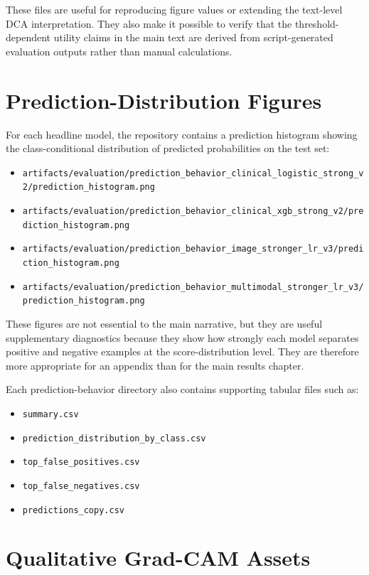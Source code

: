 These files are useful for reproducing figure values or extending the text-level DCA interpretation. They also make it possible to verify that the threshold-dependent utility claims in the main text are derived from script-generated evaluation outputs rather than manual calculations.

\section{Prediction-Distribution Figures}

For each headline model, the repository contains a prediction histogram showing the class-conditional distribution of predicted probabilities on the test set:

\begin{itemize}
    \item \texttt{artifacts/evaluation/prediction\_behavior\_clinical\_logistic\_strong\_v2/prediction\_histogram.png}
    \item \texttt{artifacts/evaluation/prediction\_behavior\_clinical\_xgb\_strong\_v2/prediction\_histogram.png}
    \item \texttt{artifacts/evaluation/prediction\_behavior\_image\_stronger\_lr\_v3/prediction\_histogram.png}
    \item \texttt{artifacts/evaluation/prediction\_behavior\_multimodal\_stronger\_lr\_v3/prediction\_histogram.png}
\end{itemize}

These figures are not essential to the main narrative, but they are useful supplementary diagnostics because they show how strongly each model separates positive and negative examples at the score-distribution level. They are therefore more appropriate for an appendix than for the main results chapter.

Each prediction-behavior directory also contains supporting tabular files such as:
\begin{itemize}
    \item \texttt{summary.csv}
    \item \texttt{prediction\_distribution\_by\_class.csv}
    \item \texttt{top\_false\_positives.csv}
    \item \texttt{top\_false\_negatives.csv}
    \item \texttt{predictions\_copy.csv}
\end{itemize}

\section{Qualitative Grad-CAM Assets}

